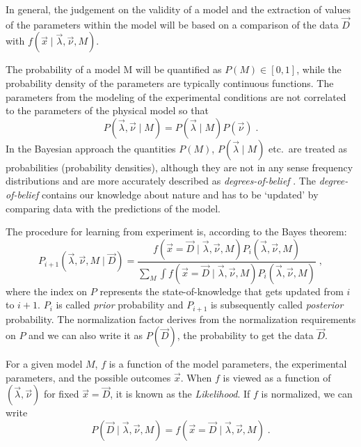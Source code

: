 In general, the judgement on the validity of a model and the extraction of values of the parameters within the model will be based on a comparison of the data $\vec{D}$ with $f(\vec{x}\mid\vec{\lambda},\vec{\nu},M)$.

 The probability of a model M will be quantified as $P(M)\in[0,1]$, while the probability density of the parameters are typically continuous functions. The parameters from the modeling of the experimental conditions are not correlated to the parameters of the physical model so that
\begin{equation}P(\vec{\lambda},\vec{\nu}\mid M)=P(\vec{\lambda}\mid M)P(\vec{\nu})\;.\end{equation}
In the Bayesian approach the quantities $P(M)$, $P(\vec{\lambda}\mid M)$ etc.~are treated as probabilities (probability densities), although they are not in any sense frequency distributions and are more accurately described as \emph{degrees-of-belief} \cite{bayesbook}. The \emph{degree-of-belief} contains our knowledge about nature and has to be `updated' by comparing data with the predictions of the model.

The procedure for learning from experiment is, according to the Bayes theorem:
\begin{equation}P_{i+1}(\vec{\lambda},\vec{\nu},M\mid\vec{D})=\frac{f(\vec{x}=\vec{D}\mid\vec{\lambda},\vec{\nu},M)P_i(\vec{\lambda},\vec{\nu},M)}{\sum_M\int f(\vec{x}=\vec{D}\mid\vec{\lambda},\vec{\nu},M)P_i(\vec{\lambda},\vec{\nu},M)}\;,\end{equation}
where the index on $P$ represents the state-of-knowledge that gets updated from $i$ to $i+1$. $P_i$ is called \emph{prior} probability and $P_{i+1}$ is subsequently called \emph{posterior} probability. The normalization factor derives from the normalization requirements on $P$ and we can also write it as $P(\vec{D})$, the probability to get the data $\vec{D}$.

For a given model $M$, $f$ is a function of the model parameters, the experimental parameters, and the possible outcomes $\vec{x}$. When $f$ is viewed as a function of $(\vec{\lambda},\vec{\nu})$ for fixed $\vec{x}=\vec{D}$, it is known as the \textit{Likelihood}. If $f$ is normalized, we can write
\begin{equation}P(\vec{D}\mid\vec{\lambda},\vec{\nu},M)=f(\vec{x}=\vec{D}\mid\vec{\lambda},\vec{\nu},M)\;.\end{equation}

